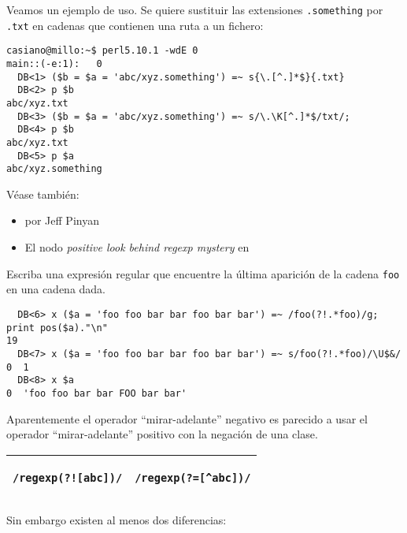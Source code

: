 Veamos un ejemplo de uso. Se quiere
sustituir las extensiones \verb|.something| por \verb|.txt|
en cadenas que contienen una ruta a un fichero:

\begin{verbatim}
casiano@millo:~$ perl5.10.1 -wdE 0
main::(-e:1):   0
  DB<1> ($b = $a = 'abc/xyz.something') =~ s{\.[^.]*$}{.txt}
  DB<2> p $b
abc/xyz.txt
  DB<3> ($b = $a = 'abc/xyz.something') =~ s/\.\K[^.]*$/txt/;
  DB<4> p $b
abc/xyz.txt
  DB<5> p $a
abc/xyz.something
\end{verbatim}

Véase también:
\begin{itemize}
\item {} por Jeff Pinyan 
\item El nodo {\it positive look behind regexp mystery} en 
\end{itemize}


Escriba una expresión regular que encuentre la última aparición de la cadena \verb|foo|
en una cadena dada.
\begin{verbatim}
  DB<6> x ($a = 'foo foo bar bar foo bar bar') =~ /foo(?!.*foo)/g; print pos($a)."\n"
19
  DB<7> x ($a = 'foo foo bar bar foo bar bar') =~ s/foo(?!.*foo)/\U$&/
0  1
  DB<8> x $a
0  'foo foo bar bar FOO bar bar'
\end{verbatim}



Aparentemente el operador ``mirar-adelante'' negativo es parecido a usar el operador ``mirar-adelante'' positivo
con la negación de una clase. 

\begin{center}
\begin{tabular}{p{4cm}|p{4cm}}
\hline
\begin{verbatim}
/regexp(?![abc])/
\end{verbatim}
&
\begin{verbatim}
/regexp(?=[^abc])/
\end{verbatim}\\
\hline
\end{tabular}
\end{center}

Sin embargo existen al menos dos diferencias:

